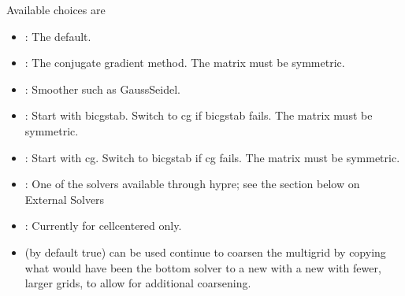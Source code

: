 \documentclass[letterpaper,10pt,english]{sphinxmanual}
\begin{document}
\begin{sphinxVerbatim}[commandchars=\\\{\}]
   
\end{sphinxVerbatim}

\sphinxAtStartPar
Available choices are
\begin{itemize}
\item {} 
\sphinxAtStartPar
{}: The default.

\item {} 
\sphinxAtStartPar
{}: The conjugate gradient method.  The
matrix must be symmetric.

\item {} 
\sphinxAtStartPar
{}: Smoother such as Gauss\sphinxhyphen{}Seidel.

\item {} 
\sphinxAtStartPar
{}: Start with bicgstab. Switch to cg
if bicgstab fails.  The matrix must be symmetric.

\item {} 
\sphinxAtStartPar
{}: Start with cg. Switch to bicgstab
if cg fails.  The matrix must be symmetric.

\item {} 
\sphinxAtStartPar
{}: One of the solvers available through hypre;
see the section below on External Solvers

\item {} 
\sphinxAtStartPar
{}: Currently for cell\sphinxhyphen{}centered only.

\item {} 
\sphinxAtStartPar
{} (by default true) can be used
continue to coarsen the multigrid by copying what would have been the
bottom solver to a new  with a new  with
fewer, larger grids, to allow for additional coarsening.


\end{itemize}
\end{document}
